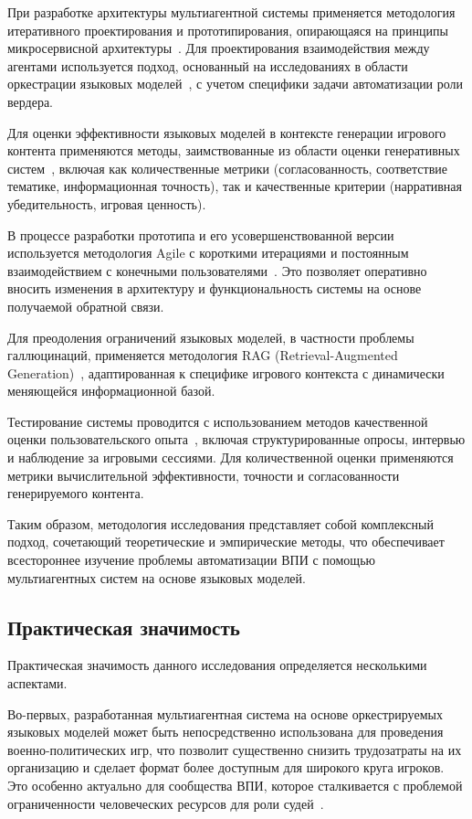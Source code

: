 При разработке архитектуры мультиагентной системы применяется методология итеративного проектирования и прототипирования, опирающаяся на принципы микросервисной архитектуры~\cite{newman2021building}. Для проектирования взаимодействия между агентами используется подход, основанный на исследованиях в области оркестрации языковых моделей~\cite{shen2023hugginggpt}, с учетом специфики задачи автоматизации роли вердера.

Для оценки эффективности языковых моделей в контексте генерации игрового контента применяются методы, заимствованные из области оценки генеративных систем~\cite{zhou2023evaluation}, включая как количественные метрики (согласованность, соответствие тематике, информационная точность), так и качественные критерии (нарративная убедительность, игровая ценность).

В процессе разработки прототипа и его усовершенствованной версии используется методология Agile с короткими итерациями и постоянным взаимодействием с конечными пользователями~\cite{martin2019clean}. Это позволяет оперативно вносить изменения в архитектуру и функциональность системы на основе получаемой обратной связи.

Для преодоления ограничений языковых моделей, в частности проблемы галлюцинаций, применяется методология RAG (Retrieval-Augmented Generation)~\cite{lewis2020retrieval}, адаптированная к специфике игрового контекста с динамически меняющейся информационной базой.

Тестирование системы проводится с использованием методов качественной оценки пользовательского опыта~\cite{albert2013measuring}, включая структурированные опросы, интервью и наблюдение за игровыми сессиями. Для количественной оценки применяются метрики вычислительной эффективности, точности и согласованности генерируемого контента.

Таким образом, методология исследования представляет собой комплексный подход, сочетающий теоретические и эмпирические методы, что обеспечивает всестороннее изучение проблемы автоматизации ВПИ с помощью мультиагентных систем на основе языковых моделей.

\subsection{Практическая значимость}

Практическая значимость данного исследования определяется несколькими аспектами.

Во-первых, разработанная мультиагентная система на основе оркестрируемых языковых моделей может быть непосредственно использована для проведения военно-политических игр, что позволит существенно снизить трудозатраты на их организацию и сделает формат более доступным для широкого круга игроков. Это особенно актуально для сообщества ВПИ, которое сталкивается с проблемой ограниченности человеческих ресурсов для роли судей~\cite{catalogwpg2023}.

